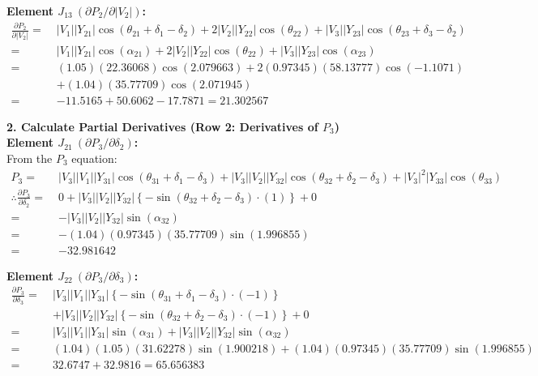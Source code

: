 \documentclass[11pt]{article}
\begin{document}
\begin{stepbox}
\vspace{0.3cm}
\noindent \textbf{Element $J_{13} \ (\partial P_2 / \partial |V_2|)$:} \\
\begin{align*}
    \frac{\partial P_2}{\partial |V_2|} =\;& |V_1||Y_{21}| \cos(\theta_{21} + \delta_1 - \delta_2) + 2|V_2||Y_{22}| \cos(\theta_{22}) + |V_3||Y_{23}| \cos(\theta_{23} + \delta_3 - \delta_2) \\[0.2cm]
    =\;& |V_1||Y_{21}|\cos(\alpha_{21}) + 2|V_2||Y_{22}|\cos(\theta_{22}) + |V_3||Y_{23}|\cos(\alpha_{23}) \\
    =\;& (1.05)(22.36068)\cos(2.079663) + 2(0.97345)(58.13777)\cos(-1.1071) \\
    & + (1.04)(35.77709)\cos(2.071945) \\
    =\;& -11.5165 + 50.6062 - 17.7871 = \mathbf{21.302567}
\end{align*}

\vspace{0.5cm}
\textbf{2. Calculate Partial Derivatives (Row 2: Derivatives of $P_3$)}\\
%
\noindent \textbf{Element $J_{21} \ (\partial P_3 / \partial \delta_2)$:} \\
From the $P_3$ equation:
\begin{align*}
    P_3 =\;& |V_3||V_1||Y_{31}| \cos(\theta_{31} + \delta_1 - \delta_3) + |V_3||V_2||Y_{32}| \cos(\theta_{32} + \delta_2 - \delta_3) + |V_3|^2|Y_{33}| \cos(\theta_{33}) \\[0.2cm]
    \therefore \frac{\partial P_3}{\partial \delta_2} =\;& 0 + |V_3||V_2||Y_{32}| \left\{-\sin(\theta_{32} + \delta_2 - \delta_3) \cdot (1)\right\} + 0 \\[0.2cm]
    =\;& -|V_3||V_2||Y_{32}|\sin(\alpha_{32}) \\
    =\;& -(1.04)(0.97345)(35.77709)\sin(1.996855) \\
    =\;& \mathbf{-32.981642}
\end{align*}

\vspace{0.3cm}
\noindent \textbf{Element $J_{22} \ (\partial P_3 / \partial \delta_3)$:} \\
\begin{align*}
    \frac{\partial P_3}{\partial \delta_3} =\;& |V_3||V_1||Y_{31}| \left\{-\sin(\theta_{31} + \delta_1 - \delta_3) \cdot (-1)\right\} \\
    & + |V_3||V_2||Y_{32}| \left\{-\sin(\theta_{32} + \delta_2 - \delta_3) \cdot (-1)\right\} + 0 \\[0.2cm]
    =\;& |V_3||V_1||Y_{31}|\sin(\alpha_{31}) + |V_3||V_2||Y_{32}|\sin(\alpha_{32}) \\
    =\;& (1.04)(1.05)(31.62278)\sin(1.900218) + (1.04)(0.97345)(35.77709)\sin(1.996855) \\
    =\;& 32.6747 + 32.9816 = \mathbf{65.656383}
\end{align*}


\end{stepbox}
\end{document}

